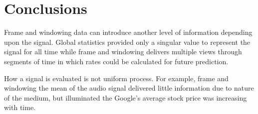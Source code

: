 \documentclass[11pt]{article}
\begin{document}
\section{Conclusions} 
Frame and windowing data can introduce another level of information depending upon the signal. Global statistics provided only a singular value to represent the signal for all time while frame and windowing delivers multiple views through segments of time in which rates could be calculated for future prediction. 

How a signal is evaluated is not uniform process. For example, frame and windowing the mean of the audio signal delivered little information due to nature of the medium, but illuminated the Google's average stock price was increasing with time. 
\end{document}
